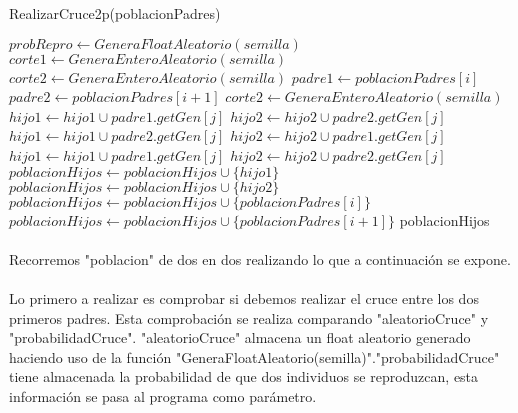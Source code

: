 	\begin{algorithm}[H]
		\caption{RealizarCruce2p(poblacionPadres)}
		\begin{algorithmic}
			
				\STATE $probRepro \leftarrow GeneraFloatAleatorio(semilla)$
					\STATE $corte1 \leftarrow GeneraEnteroAleatorio(semilla)$
					\STATE $corte2 \leftarrow GeneraEnteroAleatorio(semilla)$
					\STATE $padre1 \leftarrow poblacionPadres[i]$
					\STATE $padre2 \leftarrow poblacionPadres[i+1]$
						\STATE $corte2 \leftarrow GeneraEnteroAleatorio(semilla)$
					\ENDWHILE
						\STATE $hijo1 \leftarrow hijo1\cup padre1.getGen[j]$
						\STATE $hijo2 \leftarrow hijo2\cup padre2.getGen[j]$
					\ENDFOR
						\STATE $hijo1 \leftarrow hijo1\cup padre2.getGen[j]$
						\STATE $hijo2 \leftarrow hijo2\cup padre1.getGen[j]$
					\ENDFOR
						\STATE $hijo1 \leftarrow hijo1\cup padre1.getGen[j]$
						\STATE $hijo2 \leftarrow hijo2\cup padre2.getGen[j]$
					\ENDFOR
					\STATE $poblacionHijos \leftarrow poblacionHijos\cup\{hijo1\}$
					\STATE $poblacionHijos \leftarrow poblacionHijos\cup\{hijo2\}$
				\ELSE
					\STATE $poblacionHijos \leftarrow poblacionHijos\cup\{poblacionPadres[i]\}$
					\STATE $poblacionHijos \leftarrow poblacionHijos\cup\{poblacionPadres[i+1]\}$
				\ENDIF
			\ENDFOR
			\RETURN poblacionHijos
		\end{algorithmic}
	\end{algorithm}

	\paragraph{}Recorremos "poblacion" de dos en dos realizando lo que a continuación se expone.
	
	\paragraph{}Lo primero a realizar es comprobar si debemos realizar el cruce entre los dos primeros padres. Esta comprobación se realiza comparando "aleatorioCruce" y "probabilidadCruce". "aleatorioCruce" almacena un float aleatorio generado haciendo uso de la función "GeneraFloatAleatorio(semilla)"."probabilidadCruce" tiene almacenada la probabilidad de que dos individuos se reproduzcan, esta información se pasa al programa como parámetro.
	
